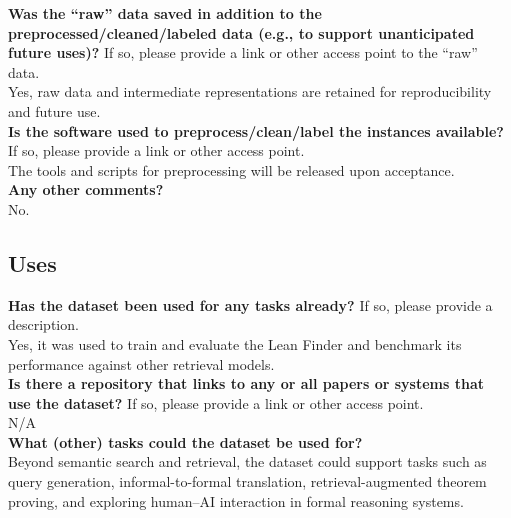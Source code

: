     \textcolor{\sectioncolor}{\textbf{Was the “raw” data saved in addition to the preprocessed/cleaned/labeled
    data (e.g., to support unanticipated future uses)?
    }
    If so, please provide a link or other access point to the “raw” data.
    } \\
    Yes, raw data and intermediate representations are retained for reproducibility and future use. \\

    \textcolor{\sectioncolor}{\textbf{Is the software used to preprocess/clean/label the instances available?
    }
    If so, please provide a link or other access point.
    } \\
    The tools and scripts for preprocessing will be released upon acceptance. \\

    \textcolor{\sectioncolor}{\textbf{Any other comments?
    }} \\
    No. \\

\subsection{Uses}

    \textcolor{\sectioncolor}{\textbf{Has the dataset been used for any tasks already?
    }
    If so, please provide a description.
    } \\
    Yes, it was used to train and evaluate the Lean Finder and benchmark its performance against other retrieval models. \\

    \textcolor{\sectioncolor}{\textbf{Is there a repository that links to any or all papers or systems that use the dataset?
    }
    If so, please provide a link or other access point.
    } \\
    N/A \\

    \textcolor{\sectioncolor}{\textbf{What (other) tasks could the dataset be used for?
    }
    } \\
    Beyond semantic search and retrieval, the dataset could support tasks such as query generation, informal-to-formal translation, retrieval-augmented theorem proving, and exploring human–AI interaction in formal reasoning systems. \\

